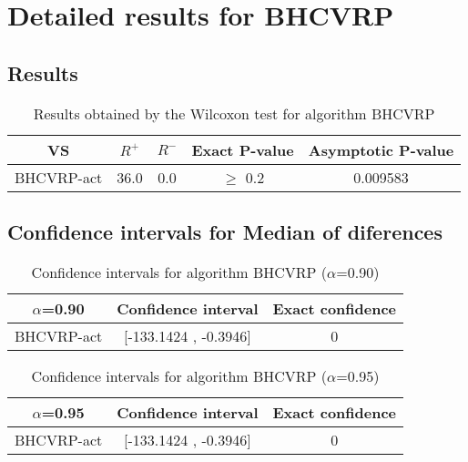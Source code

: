 \documentclass[a4paper,10pt]{article}
\begin{document}
 \clearpage 


\section{Detailed results for BHCVRP}


\subsection{Results}

\begin{table}[!htp]
\centering\small
\begin{tabular}{
|c|c|c|c|c|}
\hline
 VS & $R^{+}$ & $R^{-}$ & Exact P-value & Asymptotic P-value \\ \hline 
BHCVRP-act & 36.0 & 0.0 & $\geq$ 0.2 & 0.009583\\ \hline 

\end{tabular}
\caption{Results obtained by the Wilcoxon test for algorithm BHCVRP}
\end{table}

\subsection{Confidence intervals for Median of diferences}

\begin{table}[!htp]
\centering\small
\begin{tabular}{
|c|c|c|}
\hline
 $\alpha$=0.90 & Confidence interval & Exact confidence \\ \hline 
BHCVRP-act & [-133.1424 , -0.3946] & 0\\ \hline 

\end{tabular}
\caption{Confidence intervals for algorithm BHCVRP ($\alpha$=0.90)}
\end{table}
\begin{table}[!htp]
\centering\small
\begin{tabular}{
|c|c|c|}
\hline
 $\alpha$=0.95 & Confidence interval & Exact confidence \\ \hline 
BHCVRP-act & [-133.1424 , -0.3946] & 0\\ \hline 

\end{tabular}
\caption{Confidence intervals for algorithm BHCVRP ($\alpha$=0.95)}
\end{table}

 \clearpage 
\end{document}
